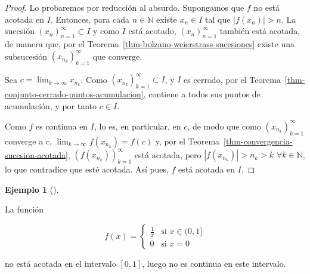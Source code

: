 \documentclass[
  a4paper,
]{scrreport}
\theoremstyle{plain}
\theoremstyle{plain}
\theoremstyle{definition}
\theoremstyle{plain}
\theoremstyle{definition}
\newtheorem{example}{Ejemplo}[chapter]
\theoremstyle{remark}
\begin{document}
\begin{tcolorbox}[enhanced jigsaw, title=\textcolor{quarto-callout-note-color}{\faInfo}\hspace{0.5em}{Demostración}, opacityback=0, titlerule=0mm, colback=white, opacitybacktitle=0.6, colbacktitle=quarto-callout-note-color!10!white, breakable, left=2mm, bottomtitle=1mm, toptitle=1mm, coltitle=black, arc=.35mm, leftrule=.75mm, toprule=.15mm, rightrule=.15mm, bottomrule=.15mm, colframe=quarto-callout-note-color-frame]

\begin{proof}

Lo probaremos por reducción al absurdo. Supongamos que \(f\) no está
acotada en \(I\). Entonces, para cada \(n\in\mathbb{N}\) existe
\(x_n\in I\) tal que \(|f(x_n)|>n\). La sucesión
\((x_n)_{n=1}^\infty\subset I\) y como \(I\) está acotado,
\((x_n)_{n=1}^\infty\) también está acotada, de manera que, por el
Teorema~\ref{thm-bolzano-weierstrass-sucesiones} existe una subsucesión
\((x_{n_k})_{k=1}^\infty\) que converge.

Sea \(c=\lim_{k\to\infty}x_{n_k}\). Como
\((x_{n_k})_{k=1}^\infty\subset I\), y \(I\) es cerrado, por el
Teorema~\ref{thm-conjunto-cerrado-puntos-acumulacion}, contiene a todos
sus puntos de acumulación, y por tanto \(c\in I\).

Como \(f\) es continua en \(I\), lo es, en particular, en \(c\), de modo
que como \((x_{n_k})_{k=1}^\infty\) converge a \(c\),
\(\lim_{k\to\infty}f(x_{n_k}) = f(c)\) y, por el
Teorema~\ref{thm-convergencia-sucesion-acotada},
\((f(x_{n_k}))_{k=1}^\infty\) está acotada, pero \(|f(x_{n_k})|>n_k>k\)
\(\forall k\in\mathbb{N}\), lo que contradice que esté acotada. Así
pues, \(f\) está acotada en \(I\).

\end{proof}

\end{tcolorbox}

\leavevmode{}%
\begin{example}[]\label{exm-función-discontinua-no-acotada}

La función

\[
f(x)=
\begin{cases}
\frac{1}{x} & \mbox{si } x\in (0,1]\\
0 & \mbox{si } x=0
\end{cases}
\]

no está acotada en el intervalo \([0,1]\), luego no es continua en este
intervalo.

\end{example}
\end{document}
